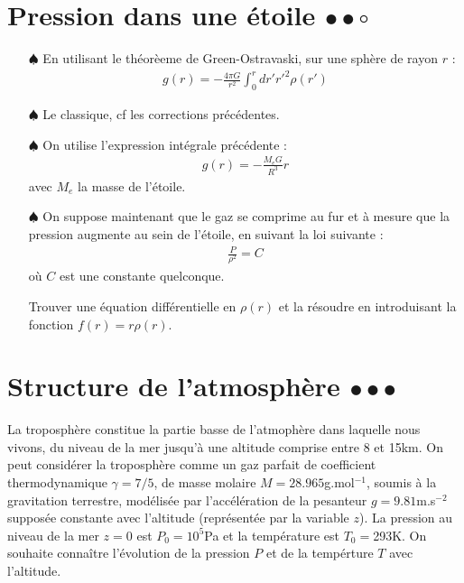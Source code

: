 \documentclass{report}
\begin{document}
\section*{Pression dans une étoile $\bullet\bullet\circ$}

\begin{itemize}

	\item[$\spadesuit$] En utilisant le théorèeme de Green-Ostravaski, sur une sphère de rayon $r$ :
	\begin{align*}
		g(r)=-\frac{4\pi G}{r^2}\int_0^r dr' r'^2 \rho(r')
	\end{align*}

	\item[$\spadesuit$] Le classique, cf les corrections précédentes.
	
	\item[$\spadesuit$] On utilise l'expression intégrale précédente :
	\begin{align*}
		g(r)=-\frac{M_eG}{R^3}r
	\end{align*}
	avec $M_e$ la masse de l'étoile. 
	
	\item[$\spadesuit$] On suppose maintenant que le gaz se comprime au fur et à mesure que la pression augmente au sein de l'étoile, en suivant la loi suivante : 
	\begin{align*}
		\frac{P}{\rho^2}= C
	\end{align*}
	où $C$ est une constante quelconque. 
	
	Trouver une équation différentielle en $\rho(r)$ et la résoudre en introduisant la fonction $f(r)=r\rho(r)$.

\end{itemize}

\newpage

\section*{Structure de l'atmosphère $\bullet\bullet\bullet$}

La troposphère constitue la partie basse de l'atmophère dans laquelle nous vivons, du niveau de la mer jusqu'à une altitude comprise entre 8 et 15km. On peut considérer la troposphère comme un gaz parfait de coefficient thermodynamique $\gamma=7/5$, de masse molaire $M=28.965$g.mol$^{-1}$, soumis à la gravitation terrestre, modélisée par l'accélération de la pesanteur $g=9.81$m.s$^{-2}$ supposée constante avec l'altitude (représentée par la variable $z$). La pression au niveau de la mer $z=0$ est $P_0=10^5$Pa et la température est $T_0=$293K. On souhaite connaître l'évolution de la pression $P$ et de la tempérture $T$ avec l'altitude.
\end{document}
